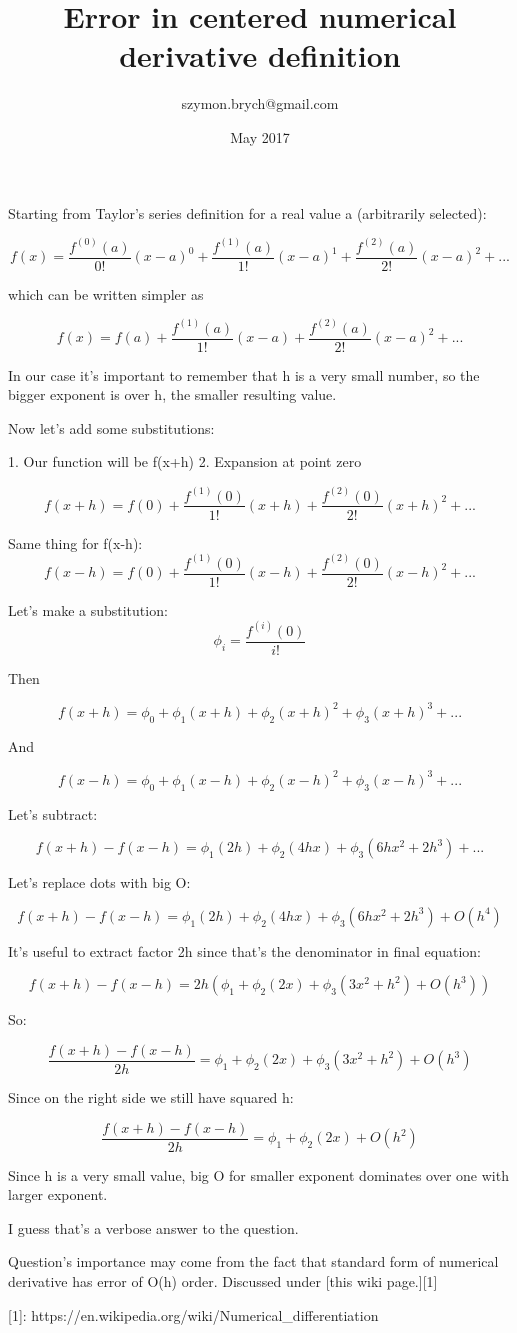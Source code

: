 \documentclass{article}
\title{Error in centered numerical derivative definition}
\author{szymon.brych@gmail.com }
\date{May 2017}
\begin{document}
\maketitle

Starting from Taylor's series definition for a real value a (arbitrarily selected):

$$f(x)=\frac{f^{(0)}(a)}{0!}(x-a)^0+\frac{f^{(1)}(a)}{1!}(x-a)^1+\frac{f^{(2)}(a)}{2!}(x-a)^2+...$$

which can be written simpler as 

$$f(x)={f(a)}+\frac{f^{(1)}(a)}{1!}(x-a)+\frac{f^{(2)}(a)}{2!}(x-a)^2+...$$

In our case it's important to remember that h is a very small number, so the bigger exponent is over h, the smaller resulting value.

Now let's add some substitutions:

 1. Our function will be f(x+h)
 2. Expansion at point zero

$$f(x+h)={f(0)}+\frac{f^{(1)}(0)}{1!}(x+h)+\frac{f^{(2)}(0)}{2!}(x+h)^2+...$$

Same thing for f(x-h):
$$f(x-h)={f(0)}+\frac{f^{(1)}(0)}{1!}(x-h)+\frac{f^{(2)}(0)}{2!}(x-h)^2+...$$

Let's make a substitution:
$$\phi_i=\frac{f^{(i)}(0)}{i!}$$

Then

$$f(x+h)=\phi_0+\phi_1(x+h)+\phi_2(x+h)^2+\phi_3(x+h)^3+...$$

And

$$f(x-h)=\phi_0+\phi_1(x-h)+\phi_2(x-h)^2+\phi_3(x-h)^3+...$$

Let's subtract:

$$f(x+h)-f(x-h)=\phi_1(2h)+\phi_2(4hx)+\phi_3(6hx^2+2h^3)+...$$

Let's replace dots with big O:

$$f(x+h)-f(x-h)=\phi_1(2h)+\phi_2(4hx)+\phi_3(6hx^2+2h^3)+O(h^4)$$

It's useful to extract factor 2h since that's the denominator in final equation:

$$f(x+h)-f(x-h)={2h}{(\phi_1+\phi_2(2x)+\phi_3(3x^2+h^2)+O(h^3))}$$

So:

$$\frac{f(x+h)-f(x-h)}{2h}={\phi_1+\phi_2(2x)+\phi_3(3x^2+h^2)+O(h^3)}$$

Since on the right side we still have squared h:

$$\frac{f(x+h)-f(x-h)}{2h}={\phi_1+\phi_2(2x)+O(h^2)}$$

Since h is a very small value, big O for smaller exponent dominates over one with larger exponent.

I guess that's a verbose answer to the question. 

Question's importance may come from the fact that standard form of numerical derivative has error of O(h) order. Discussed under [this wiki page.][1]


  [1]: https://en.wikipedia.org/wiki/Numerical\_differentiation
\end{document}

